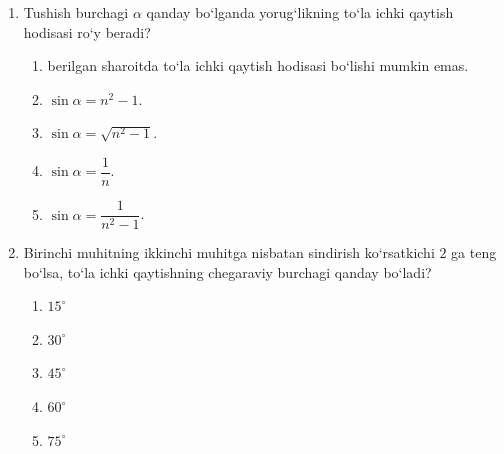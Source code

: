 \begin{enumerate}
\begin{enumerate}[label=\Alph*)]
\item $90^\circ+\alpha$
\item $\alpha$
\item $2\alpha$
\item $90^\circ-\alpha$
\item $0$
\end{enumerate}

\item Tushish burchagi $\alpha$ qanday bo‘lganda yorug‘likning to‘la ichki qaytish hodisasi ro‘y beradi?


\begin{enumerate}[label=\Alph*)]
\item berilgan sharoitda to‘la ichki qaytish hodisasi bo‘lishi mumkin emas.
\item $\sin\alpha=n^2-1$.
\item $\sin\alpha=\sqrt{n^2-1}$.
\item $\sin\alpha=\dfrac{1}{n}$.
\item $\sin\alpha=\dfrac{1}{n^2-1}$.
\end{enumerate}

\item Birinchi muhitning ikkinchi muhitga nisbatan sindirish ko‘rsatkichi $2$ ga teng bo‘lsa, to‘la ichki qaytishning chegaraviy burchagi qanday bo‘ladi?
\begin{enumerate}[label=\Alph*)]
\item $15^\circ$
\item $30^\circ$
\item $45^\circ$
\item $60^\circ$
\item $75^\circ$
\end{enumerate}


\end{enumerate}
